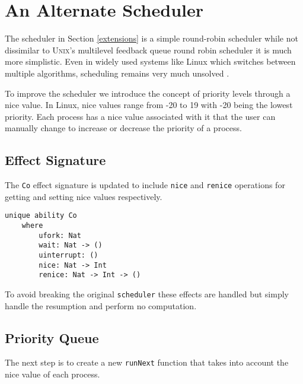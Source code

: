 \documentclass[logo,bsc,singlespacing,parskip]{infthesis}
\begin{document}
\section{An Alternate Scheduler}

The scheduler in Section \ref{extensions} is a simple round-robin scheduler
while not dissimilar to \textsc{Unix}'s multilevel feedback queue round robin
scheduler it is much more simplistic. Even in widely used systems like Linux
which switches between multiple algorithms, scheduling remains very much
unsolved \cite{Lozi2016}.

To improve the scheduler we introduce the concept of priority levels through a
nice value. In Linux, nice values range from -20 to 19 with -20 being the
lowest priority. Each process has a nice value associated with it that the
user can manually change to increase or decrease the priority of a process. 

\subsection{Effect Signature}

The \texttt{Co} effect signature is updated to include \texttt{nice} and
\texttt{renice} operations for getting and setting nice values respectively.

\begin{lstlisting}[language=unison]
unique ability Co 
    where 
        ufork: Nat
        wait: Nat -> ()
        uinterrupt: ()
        nice: Nat -> Int
        renice: Nat -> Int -> ()
\end{lstlisting}

To avoid breaking the original \texttt{scheduler} these effects are handled but
simply handle the resumption and perform no computation.

\subsection{Priority Queue}

The next step is to create a new \texttt{runNext} function that takes into
account the nice value of each process.
\end{document}
